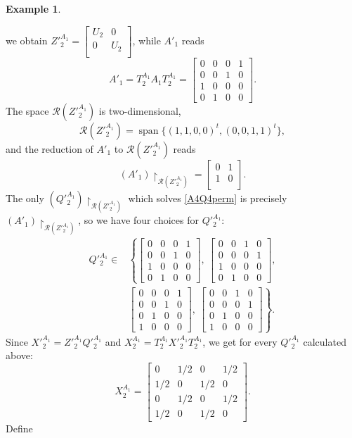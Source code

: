 \documentclass{article}
\theoremstyle{definition}\newtheorem{example}{Example}[section]
\def\R{{\mathcal{R}}}
\newcommand{\mat}[4]{\left[\begin{array}{cc}#1 & #2 \\ #3 & #4 \\
	\end{array}\right]}
\begin{document}
\begin{example}
\begin{itemize}
		we obtain $Z'^{A_1}_2=\mat{U_2}{0}{0}{U_2}$, while $A'_1$ reads
		$$A'_1=T^{A_1}_2A_1T^{A_1}_2=\left[\begin{array}{cccc}
			0 & 0 & 0 & 1\\0 & 0 & 1 & 0\\ 1 & 0 & 0 & 0\\0 & 1 & 0 & 0			\end{array}\right].$$
			The space $\R(Z'^{A_1}_2)$ is two-dimensional,
			$$\R(Z'^{A_1}_2)=\operatorname{span}\{(1,1,0,0)^t,(0,0,1,1)^t\},$$
			and the reduction of $A'_1$ to $\R(Z'^{A_1}_2)$ reads
			$$\left(A'_1\right)\upharpoonright_{\R\left(Z'^{A_1}_2\right)}=\mat{0}{1}{1}{0}.$$
			The only $(Q'^{A_1}_2)\upharpoonright_{\R\left(Z'^{A_1}_2\right)}$ which solves \eqref{A4Q4perm} is precisely $\left(A'_1\right)\upharpoonright_{\R\left(Z'^{A_1}_2\right)}$, so we have four choices for $Q'^{A_1}_2$:
		$$\begin{aligned}
			Q'^{A_1}_2\in & \left\{\left[\begin{array}{cccc}
	0 & 0 & 0 & 1\\0 & 0 & 1 & 0\\ 1 & 0 & 0 & 0\\0 & 1 & 0 & 0			\end{array}\right],\ \left[\begin{array}{cccc}
				0 & 0 & 1 & 0\\0 & 0 & 0 & 1\\ 1 & 0 & 0 & 0\\0 & 1 & 0 & 0			\end{array}\right],\right.\\
								& \left. \left[\begin{array}{cccc}
	0 & 0 & 0 & 1\\0 & 0 & 1 & 0\\ 0 & 1 & 0 & 0\\1 & 0 & 0 & 0	\end{array}\right],\ \left[\begin{array}{cccc}	0 & 0 & 1 & 0\\0 & 0 & 0 & 1\\ 0 & 1 & 0 & 0\\1 & 0 & 0 & 0			\end{array}\right]\right\}.
				\end{aligned}$$
Since $X'^{A_1}_2=Z'^{A_1}_2Q'^{A_1}_2$ and $X^{A_1}_2=T^{A_1}_2X'^{A_1}_2T^{A_1}_2$, we get for every $Q'^{A_1}_2$ calculated above:
\begin{equation}\label{XA12}
	X^{A_1}_2= \left[\begin{array}{cccc}
		0 & 1/2 & 0 & 1/2\\1/2 & 0 & 1/2 & 0\\ 0 & 1/2 & 0 & 1/2\\1/2 & 0 & 1/2 & 0			\end{array}\right].
		\end{equation}
		Define
		

\end{itemize}
\end{example}
\end{document}
